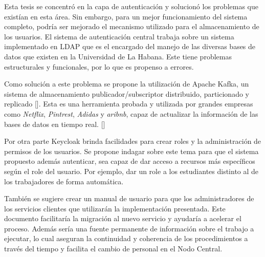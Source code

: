 \begin{recomendations}
	Esta tesis se concentró en la capa de autenticación y solucionó los problemas que existían  en esta área. Sin embargo, para un mejor funcionamiento del sistema completo, podría ser mejorado el mecanismo utilizado para el almacenamiento de los usuarios. El sistema de autenticación central trabaja sobre un sistema implementado en LDAP que es el encargado del manejo de las diversas bases de datos que existen en la Universidad de La Habana. Este tiene problemas estructurales y funcionales, por lo que es propenso a errores. 
    
     Como solución a este problema se propone la utilización de Apache Kafka, un sistema de almacenamiento publicador/subscriptor distribuido, particionado y replicado [\cite{gallegos2015aplicacion}]. Esta es una herramienta probada y utilizada por grandes empresas como \textit{Netflix}, \textit{Pintrest}, \textit{Adidas} y \textit{aribnb}, capaz de actualizar la información de las bases de datos en tiempo real. [\cite{apacheApacheKafka}]
     
     Por otra parte Keycloak brinda facilidades para crear roles y la administración de permisos de los usuarios. Se propone indagar sobre este tema para que el sistema propuesto además autenticar, sea capaz de dar acceso a recursos más específicos según el role del usuario. Por ejemplo, dar un role a los estudiantes distinto al de los trabajadores de forma automática.
     
     También se sugiere crear un manual de usuario para que los administradores de los servicios clientes que utilizarán la implementación presentada. Este documento facilitaría la migración al nuevo servicio y ayudaría a acelerar el proceso. Además sería una fuente permanente de información sobre el trabajo a ejecutar, lo cual aseguran la continuidad y coherencia de los procedimientos a través del tiempo y facilita el cambio de personal en el Nodo Central.
     
     
     
     
\end{recomendations}
